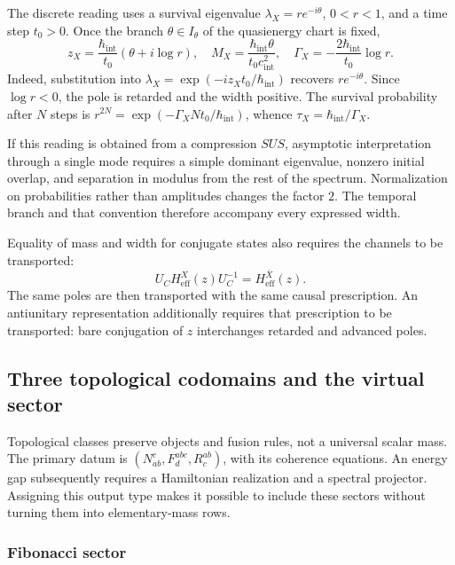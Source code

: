 The discrete reading uses a survival eigenvalue
\(\lambda_X=re^{-i\theta}\), \(0<r<1\), and a time step
\(t_0>0\). Once the branch \(\theta\in I_\theta\) of the quasienergy
chart is fixed,
\begin{equation}
 z_X=\frac{\hbar_{\mathrm{int}}}{t_0}
 (\theta+i\log r),\quad
 M_X=\frac{\hbar_{\mathrm{int}}\theta}{t_0c_{\mathrm{int}}^2},\quad
 \Gamma_X=-\frac{2\hbar_{\mathrm{int}}}{t_0}\log r.
 \label{vi:eq:anchura-discreta-familias}
\end{equation}
Indeed, substitution into
\(\lambda_X=\exp(-iz_Xt_0/\hbar_{\mathrm{int}})\) recovers
\(re^{-i\theta}\). Since \(\log r<0\), the pole is retarded and the
width positive. The survival probability after \(N\) steps is
\(r^{2N}=\exp(-\Gamma_XNt_0/\hbar_{\mathrm{int}})\), whence
\(\tau_X=\hbar_{\mathrm{int}}/\Gamma_X\).

If this reading is obtained from a compression \(SUS\), asymptotic
interpretation through a single mode requires a simple dominant
eigenvalue, nonzero initial overlap, and separation in modulus from the rest
of the spectrum. Normalization on probabilities rather than
amplitudes changes the factor \(2\). The temporal branch and that convention
therefore accompany every expressed width.

Equality of mass and width for conjugate states also requires the
channels to be transported:
\[
 U_C H_{\mathrm{eff}}^X(z)U_C^{-1}=H_{\mathrm{eff}}^{\bar X}(z).
\]
The same poles are then transported with the same causal
prescription. An antiunitary representation additionally requires that
prescription to be transported: bare conjugation of \(z\) interchanges
retarded and advanced poles.

\subsection{Three topological codomains and the virtual sector}
\label{vi:subsec:topologicos-familias}

Topological classes preserve objects and fusion rules, not a
universal scalar mass. The primary datum is
\((N_{ab}^{c},F^{abc}_d,R^{ab}_c)\), with its coherence equations.
An energy gap subsequently requires a Hamiltonian realization and
a spectral projector. Assigning this output type makes it possible
to include these sectors without turning them into elementary-mass rows.

\subsubsection{Fibonacci sector}

